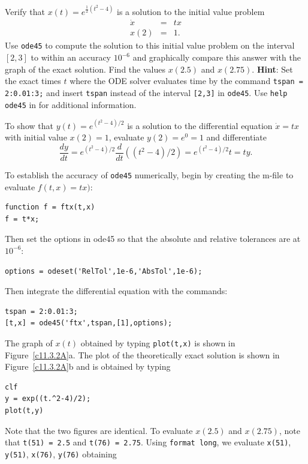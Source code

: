 \documentclass{ximera}
\begin{document}
\begin{computerExercise} \label{c11.3.2A}
Verify that $x(t) = e^{\frac{1}{2}(t^2-4)}$ is a solution to the initial 
value problem
\[
\begin{array}{rcl}
\dot{x} & = & tx \\
x(2) & = & 1.
\end{array}
\]
Use {\tt ode45} to compute the solution to this initial value problem on the
interval $[2,3]$ to within an accuracy $10^{-6}$ and graphically compare this 
answer with the graph of the exact solution.  Find the values $x(2.5)$ and
$x(2.75)$.  {\bf Hint}: Set the exact times $t$ where the ODE solver 
evaluates time by the command {\tt tspan = 2:0.01:3;} and insert {\tt tspan}
instead of the interval {\tt [2,3]} in {\tt ode45}.  Use {\tt help ode45} in 
\Matlab for additional information. 

\begin{solution}

To show that $y(t)=e^{(t^2-4)/2}$ is a solution to the differential equation
$\dot{x}=tx$ with initial value $x(2)=1$, evaluate $y(2)=e^0=1$ and
differentiate
\[
\frac{dy}{dt} = e^{(t^2-4)/2}\frac{d}{dt}((t^2-4)/2) = 
e^{(t^2-4)/2}t = ty.
\]

To establish the accuracy of {\tt ode45} numerically, begin by creating the 
m-file to evaluate $f(t,x)=tx)$:
\begin{verbatim}
function f = ftx(t,x)
f = t*x;
\end{verbatim}
Then set the options in {\sf ode45} so that the absolute and relative
tolerances are at $10^{-6}$:
\begin{verbatim}
options = odeset('RelTol',1e-6,'AbsTol',1e-6);
\end{verbatim}
Then integrate the differential equation with the commands:
\begin{verbatim}
tspan = 2:0.01:3;
[t,x] = ode45('ftx',tspan,[1],options);
\end{verbatim}
The graph of $x(t)$ obtained by typing {\tt plot(t,x)} is shown in
Figure~\ref{c11.3.2A}a.  The plot of the theoretically exact solution
is shown in Figure~\ref{c11.3.2A}b and is obtained by typing
\begin{verbatim}
clf
y = exp((t.^2-4)/2);
plot(t,y)
\end{verbatim}
Note that the two figures are identical.  To evaluate $x(2.5)$ and $x(2.75)$,
note that {\tt t(51) = 2.5} and {\tt t(76) = 2.75}.  Using {\tt format long}, 
we evaluate {\tt x(51)}, {\tt y(51)}, {\tt x(76)}, {\tt y(76)} obtaining


\end{solution}
\end{computerExercise}
\end{document}
